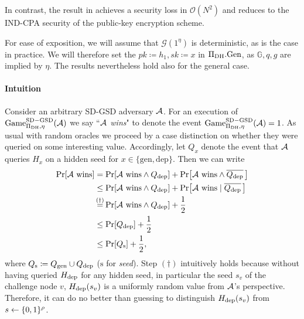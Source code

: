 In contrast, the result in \cite{ttkem} achieves a security loss in $\mathcal{O}(N^2)$ and reduces to the IND-CPA security of the public-key encryption scheme.

For ease of exposition, we will assume that $\mathcal{G}(1^\eta)$ is deterministic, as is the case in practice. We will therefore set the $pk \coloneqq h_1, sk \coloneqq x$ in $\Pi_{\mathrm{DH}}.\mathrm{Gen}$, as $\mathbb{G}, q, g$ are implied by $\eta$. The results nevertheless hold also for the general case.

\paragraph{Intuition}
Consider an arbitrary SD-GSD adversary $\mathcal{A}$. For an execution of $\mathrm{Game}_{\Pi_{\mathrm{DH}}, \eta}^{\mathrm{SD-GSD}}(\mathcal{A})$ we say ``\emph{$\mathcal{A}$ wins}" to denote the event $\mathrm{Game}_{\Pi_{\mathrm{DH}}, \eta}^{\mathrm{SD-GSD}}(\mathcal{A}) = 1$.
As usual with random oracles we proceed by a case distinction on whether they were queried on some interesting value. Accordingly, let $Q_{x}$ denote the event that $\mathcal{A}$ queries $H_{x}$ on a hidden seed for $x \in \{\mathrm{gen}, \mathrm{dep}\}$. Then we can write
\begin{align} \label{eq:theorem-sd-gsd-security-win-cases}
	\begin{split}
		\pr{\wins} & = \pr{\wins \land \qdep} + \pr{\wins \land \overline{\qdep} \,} \\
		& \le \pr{\wins \land \qdep} + \pr{\wins \mid \overline{\qdep} \,} \\
		& \stackrel{\mathclap{(\dagger)}}{=}  \pr{\wins \land \qdep} + \frac{1}{2}         \\
		& \le \pr{\qdep} + \frac{1}{2} \\
		& \le \pr{\qs} + \frac{1}{2},
	\end{split}
\end{align}
where $Q_\mathrm{s} \coloneqq Q_\mathrm{gen} \cup Q_\mathrm{dep}$ ($\mathrm{s}$ for \emph{seed}). Step $(\dagger)$ intuitively holds because without having queried $H_\mathrm{dep}$ for any hidden seed, in particular the seed $s_v$ of the challenge node $v$, $H_\mathrm{dep}(s_v)$ is a uniformly random value from $\mathcal{A}$'s perspective. Therefore, it can do no better than guessing to distinguish $H_\mathrm{dep}(s_v)$ from $s \leftarrow \{0, 1\}^\rho$.


